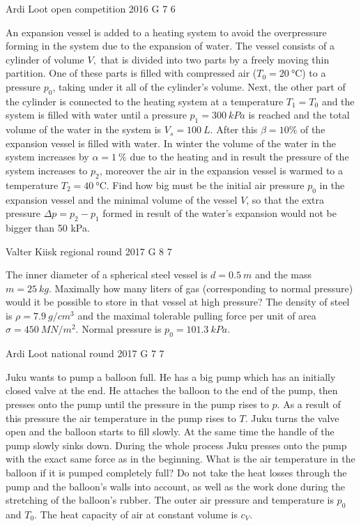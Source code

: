 \documentclass[11pt]{article}
\begin{document}
{Ardi Loot} %
{open competition} %
{2016} %
{G 7} %
{6} %
{

\ifEngStatement
An expansion vessel is added to a heating system to avoid the overpressure forming in the system due to the expansion of water. The vessel consists of a cylinder of volume $V,$ that is divided into two parts by a freely moving thin partition. One of these parts is filled with compressed air ($T_{0}=\SI{20}{\celsius}$) to a pressure $p_{0}$, taking under it all of the cylinder’s volume. Next, the other part of the cylinder is connected to the heating system at a temperature $T_{1}=T_{0}$ and the system is filled with water until a pressure $p_{1}=\SI{300}{kPa}$ is reached and the total volume of the water in the system is $V_{s}=\SI{100}{L}$. After this $\beta=10\%$ of the expansion vessel is filled with water. In winter the volume of the water in the system increases by $\alpha=\SI{1}{\%}$ due to the heating and in result the pressure of the system increases to $p_{2}$, moreover the air in the expansion vessel is warmed to a temperature $T_{2}=\SI{40}{\celsius}$. Find how big must be the initial air pressure $p_{0}$ in the expansion vessel and the minimal volume of the vessel $V$, so that the extra pressure $\Delta p=p_{2}-p_{1}$ formed in result of the water’s expansion would not be bigger than 50 kPa.
\fi
}

{Valter Kiisk} %
{regional round} %
{2017} %
{G 8} %
{7} %
{

\ifEngStatement
The inner diameter of a spherical steel vessel is $d=\SI{0.5}{m}$ and the mass $m=\SI{25}{kg}$. Maximally how many liters of gas (corresponding to normal pressure) would it be possible to store in that vessel at high pressure? The density of steel is $\rho=\SI{7.9}{g/cm^3}$ and the maximal tolerable pulling force per unit of area $\sigma=\SI{450}{MN/m^2}$. Normal pressure is $p_0=\SI{101.3}{kPa}$.
\fi
}

{Ardi Loot} %
{national round} %
{2017} %
{G 7} %
{7} %
{

\ifEngStatement
Juku wants to pump a balloon full. He has a big pump which has an initially closed valve at the end. He attaches the balloon to the end of the pump, then presses onto the pump until the pressure in the pump rises to $p$. As a result of this pressure the air temperature in the pump rises to $T$. Juku turns the valve open and the balloon starts to fill slowly. At the same time the handle of the pump slowly sinks down. During the whole process Juku presses onto the pump with the exact same force as in the beginning. What is the air temperature in the balloon if it is pumped completely full? Do not take the heat losses through the pump and the balloon’s walls into account, as well as the work done during the stretching of the balloon’s rubber. The outer air pressure and temperature is $p_0$ and $T_0$. The heat capacity of air at constant volume is $c_V$.
\fi
}
\end{document}
